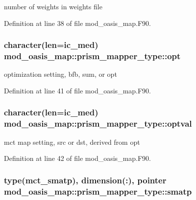 number of weights in weights file 



Definition at line 38 of file mod\+\_\+oasis\+\_\+map.\+F90.

\hypertarget{structmod__oasis__map_1_1prism__mapper__type_a3b10832f360b8f2061807dfdec6be493}{
\subsubsection[{opt}]{\setlength{\rightskip}{0pt plus 5cm}character(len=ic\+\_\+med) mod\+\_\+oasis\+\_\+map\+::prism\+\_\+mapper\+\_\+type\+::opt\hspace{0.3cm}{\ttfamily [private]}}}\label{structmod__oasis__map_1_1prism__mapper__type_a3b10832f360b8f2061807dfdec6be493}


optimization setting, bfb, sum, or opt 



Definition at line 41 of file mod\+\_\+oasis\+\_\+map.\+F90.

\hypertarget{structmod__oasis__map_1_1prism__mapper__type_ad1516b48d26a0cf57a3c61c58298aa09}{
\subsubsection[{optval}]{\setlength{\rightskip}{0pt plus 5cm}character(len=ic\+\_\+med) mod\+\_\+oasis\+\_\+map\+::prism\+\_\+mapper\+\_\+type\+::optval\hspace{0.3cm}{\ttfamily [private]}}}\label{structmod__oasis__map_1_1prism__mapper__type_ad1516b48d26a0cf57a3c61c58298aa09}


mct map setting, src or dst, derived from opt 



Definition at line 42 of file mod\+\_\+oasis\+\_\+map.\+F90.

\hypertarget{structmod__oasis__map_1_1prism__mapper__type_a46e59a2d0c41fc11532e14ef413522f1}{
\subsubsection[{smatp}]{\setlength{\rightskip}{0pt plus 5cm}type(mct\+\_\+smatp), dimension(\+:), pointer mod\+\_\+oasis\+\_\+map\+::prism\+\_\+mapper\+\_\+type\+::smatp\hspace{0.3cm}{\ttfamily [private]}}}\label{structmod__oasis__map_1_1prism__mapper__type_a46e59a2d0c41fc11532e14ef413522f1}



